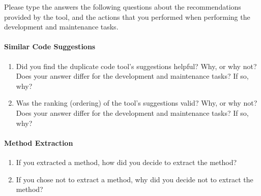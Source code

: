 \documentclass[12pt]{article}
\begin{document}
Please type the answers the following questions about the
recommendations provided by the tool, and the actions that you
performed when performing the development and maintenance tasks.

\paragraph{Similar Code Suggestions}

\begin{enumerate}
  \item Did you find the duplicate code tool's suggestions helpful?
    Why, or why not? Does your answer differ for the development and
    maintenance tasks? If so, why?
  \item Was the ranking (ordering) of the tool's suggestions valid?
    Why, or why not? Does your answer differ for the development and
    maintenance tasks? If so, why?
\end{enumerate}

\paragraph{Method Extraction}

\begin{enumerate}
  \item If you extracted a method, how did you decide to extract the
    method? 
  \item If you chose not to extract a method, why did you decide not
    to extract the method?
\end{enumerate}
\end{document}
